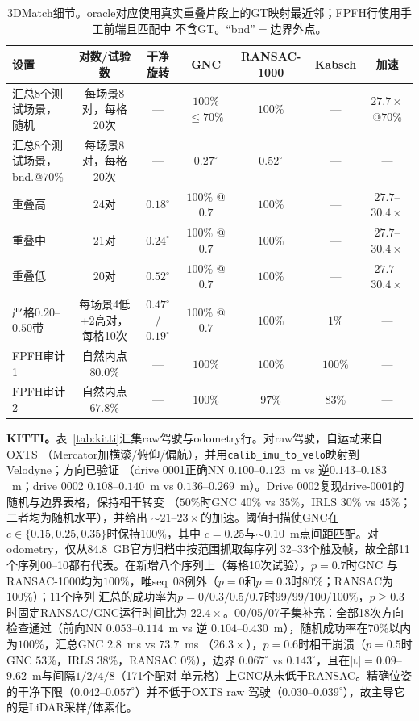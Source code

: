 \begin{table}[t]
\caption{3DMatch细节。oracle对应使用真实重叠片段上的GT映射最近邻；FPFH行使用手工前端且匹配中
不含GT。“bnd”$=$边界外点。}
\label{tab:3dmatch}
\centering
\scriptsize
\setlength{\tabcolsep}{2.2pt}
\begin{tabular}{lcccccc}
\toprule
设置 & 对数/试验数 & 干净旋转 & GNC & RANSAC-1000 & Kabsch & 加速 \\
\midrule
汇总8个测试场景，随机 & 每场景8对，每格20次 & --- & $100\%$ $\le70\%$ & $100\%$ & --- & $27.7\times$ @$70\%$ \\
汇总8个测试场景，bnd.@$70\%$ & 每场景8对，每格20次 & --- & $0.27^\circ$ & $0.52^\circ$ & --- & --- \\
重叠高 & 24对 & $0.18^\circ$ & $100\%$ @$0.7$ & $100\%$ & --- & $27.7$--$30.4\times$ \\
重叠中 & 21对 & $0.24^\circ$ & $100\%$ @$0.7$ & $100\%$ & --- & $27.7$--$30.4\times$ \\
重叠低 & 20对 & $0.52^\circ$ & $100\%$ @$0.7$ & $100\%$ & --- & $27.7$--$30.4\times$ \\
严格$0.20$--$0.50$带 & 每场景4低+2高对，每格10次 & $0.47^\circ$ / $0.19^\circ$ & $100\%$ @$0.7$ & $100\%$ & $1\%$ & --- \\
FPFH审计1 & 自然内点$80.0\%$ & --- & $100\%$ & $100\%$ & $100\%$ & --- \\
FPFH审计2 & 自然内点$67.8\%$ & --- & $100\%$ & $97\%$ & $83\%$ & --- \\
\bottomrule
\end{tabular}
\end{table}

\noindent\textbf{KITTI。}表~\ref{tab:kitti}汇集raw驾驶与odometry行。对raw驾驶，自运动来自OXTS
（Mercator加横滚/俯仰/偏航），并用\texttt{calib\_imu\_to\_velo}映射到Velodyne；方向已验证
（drive 0001正确NN $0.100$--$0.123$~m vs 逆$0.143$--$0.183$~m；drive 0002 $0.108$--$0.140$~m
vs $0.136$--$0.269$~m）。Drive 0002复现drive-0001的随机与边界表格，保持相干转变
（$50\%$时GNC $40\%$ vs $35\%$，IRLS $30\%$ vs $45\%$；二者均为随机水平），并给出
$\sim21$--$23\times$的加速。阈值扫描使GNC在$c\in\{0.15,0.25,0.35\}$时保持$100\%$，其中
$c=0.25$与$\sim0.10$~m点间距匹配。对odometry，仅从84.8~GB官方归档中按范围抓取每序列
32--33个触及帧，故全部11个序列00--10都有代表。在新增八个序列上（每格10次试验），$p=0.7$时GNC
与RANSAC-1000均为$100\%$，唯seq~08例外（$p=0$和$p=0.3$时$80\%$；RANSAC为$100\%$）；11个序列
汇总的成功率为$p=0/0.3/0.5/0.7$时$99/99/100/100\%$，$p\ge0.3$时固定RANSAC/GNC运行时间比为
$22.4\times$。00/05/07子集补充：全部18次方向检查通过（前向NN $0.053$--$0.114$~m vs 逆
$0.104$--$0.430$~m），随机成功率在$70\%$以内为$100\%$，汇总GNC $2.8$~ms vs $73.7$~ms
（$26.3\times$），$p=0.6$时相干崩溃（$p=0.5$时GNC $53\%$，IRLS $38\%$，RANSAC $0\%$），边界
$0.067^\circ$ vs $0.143^\circ$，且在$|\mathbf{t}|=0.09$--$9.62$~m与间隔$1/2/4/8$（171个配对
单元格）上GNC从未低于RANSAC。精确位姿的干净下限（$0.042$--$0.057^\circ$）并不低于OXTS raw
驾驶（$0.030$--$0.039^\circ$），故主导它的是LiDAR采样/体素化。

